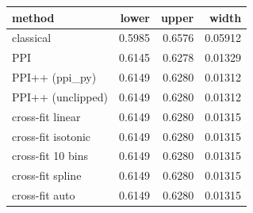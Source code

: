 \begin{tabular}{lrrr}
\toprule
method & lower & upper & width\\
\midrule
classical & 0.5985 & 0.6576 & 0.05912\\
PPI & 0.6145 & 0.6278 & 0.01329\\
PPI++ (ppi\_py) & 0.6149 & 0.6280 & 0.01312\\
PPI++ (unclipped) & 0.6149 & 0.6280 & 0.01312\\
cross-fit linear & 0.6149 & 0.6280 & 0.01315\\
cross-fit isotonic & 0.6149 & 0.6280 & 0.01315\\
cross-fit 10 bins & 0.6149 & 0.6280 & 0.01315\\
cross-fit spline & 0.6149 & 0.6280 & 0.01315\\
cross-fit auto & 0.6149 & 0.6280 & 0.01315\\
\bottomrule
\end{tabular}